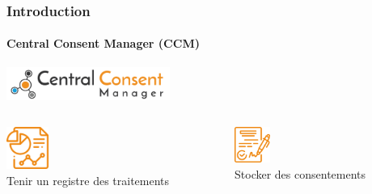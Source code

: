 \documentclass[aspectratio=169]{beamer}
\begin{document}
\begin{frame}
    \frametitle{Introduction}
    \framesubtitle{Central Consent Manager (CCM)}
    \begin{center}
        \includegraphics[width=0.4\textwidth]{ccm_.png}
    \end{center}
    \hfill
    \begin{columns}
        \begin{column}{0.45\textwidth}
            \begin{center}
                \includegraphics[width=0.2\textwidth]{processing.png}\\
                Tenir un registre des traitements
            \end{center}
        \end{column}
        \begin{column}{0.5\textwidth}
            \begin{center}
                \includegraphics[width=0.2\textwidth]{consent.png}\\
                Stocker des consentements
            \end{center}
        \end{column}
    \end{columns}
\end{frame}
\end{document}
